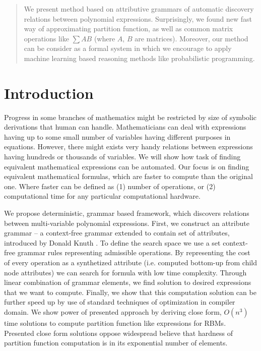\documentclass{article}
\begin{document}
 





\vskip 0.3in


\begin{abstract} 
We present method based on attributive grammars of automatic discovery relations between polynomial expressions.
Surprisingly, we found new fast way of approximating partition function, as well as common matrix operations
like $\sum AB$ (where $A$, $B$ are matrices). Moreover, our method can be consider as a formal system in which
we encourage to apply machine learning based reasoning methods like probabilistic programming.

\end{abstract} 

\section{Introduction} \label{introduction} 
Progress in some branches of
mathematics might be restricted by size of symbolic derivations that human can
handle.  Mathematicians can deal with expressions having up to some small
number of variables having different purposes in equations. However, there
might exists very handy relations between expressions having hundreds or
thousands of variables. We will show how task of finding equivalent
mathematical expressions can be automated. Our focus is on finding equivalent
mathematical formulas, which are faster to compute than the original one. Where
faster can be defined as (1) number of operations, or (2) computational time
for any particular computational hardware.


We propose deterministic, grammar based framework, which discovers relations between
multi-variable polynomial expressions. First, we construct an attribute grammar
-- a context-free grammar extended to contain set of attributes, introduced by
Donald Knuth \cite{knuth1968semantics}. To define the search space we use a set
context-free grammar rules representing admissible operations. By representing
the cost of every operation as a synthetized attribute (i.e. computed bottom-up from child node attributes)
we can search for formula with low time complexity.
Through linear combination of grammar elements, we find solution to desired 
expressions that we want to compute. Finally, we
show that this computation solution can be further speed up by use of standard
techniques of optimization in compiler domain. We show power of presented
approach by deriving close form, $O(n^3)$ time solutions to compute partition
function like expressions for RBMs. Presented close form solutions oppose
widespread believe that hardness of partition function computation is in its
exponential number of elements.
\end{document}
